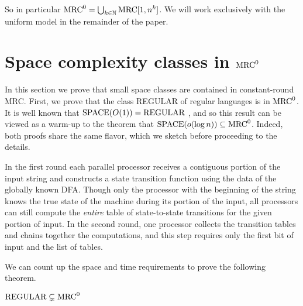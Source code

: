 \documentclass[letterpaper,USenglish]{lipics}
\theoremstyle{definition}
\theoremstyle{remark}
\newcommand{\N}{\mathbb{N}}
\newcommand{\mrc}{\textup{MRC}}
\begin{document}
So in particular $\mrc^0=\bigcup_{k\in\N}\text{MRC}[1,n^k]$. We will work
exclusively with the uniform model in the remainder of the paper.

\section{Space complexity classes in $\mrc^0$} \label{sec:spacebound}

In this section we prove that small space classes are contained in
constant-round MRC. First, we prove that the class REGULAR of regular languages
is in $\mrc^0$. It is well known that $\textup{SPACE}(O(1)) = \textup{REGULAR}$
\cite{Shepherdson59}, and so this result can be viewed as a warm-up to the
theorem that $\textup{SPACE}(o(\log n)) \subseteq \mrc^0$. Indeed, both proofs
share the same flavor, which we sketch before proceeding to the details.

In the first round each parallel processor receives a contiguous portion of the
input string and constructs a state transition function using the data of the
globally known DFA. Though only the processor with the beginning of the string
knows the true state of the machine during its portion of the input, all
processors can still compute the \emph{entire} table of state-to-state
transitions for the given portion of input. In the second round, one processor
collects the transition tables and chains together the computations, and this
step requires only the first bit of input and the list of tables.

We can count up the space and time requirements to prove the following theorem.

\begin{theorem}\label{thm:reg}
   $\textup{REGULAR} \subsetneq \mrc^0$
\end{theorem}
\end{document}
